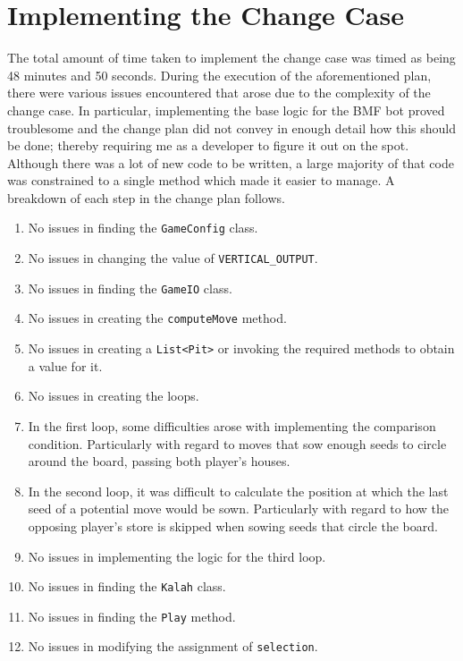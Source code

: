 \documentclass[10pt, a4paper, conference]{IEEEtran}
\begin{document}
\section{Implementing the Change Case}
The total amount of time taken to implement the change case was timed as being 
48 minutes and 50 seconds. During the execution of the aforementioned plan,
there were various issues encountered that arose due to the complexity of
the change case. In particular, implementing the base logic for the BMF bot
proved troublesome and the change plan did not convey in enough detail how
this should be done; thereby requiring me as a developer to figure it out on
the spot. Although there was a lot of new code to be written, a large majority
of that code was constrained to a single method which made it easier to
manage. A breakdown of each step in the change plan follows.
\begin{enumerate}
  \item No issues in finding the \texttt{GameConfig} class.
  \item No issues in changing the value of \texttt{VERTICAL\_OUTPUT}.
  \item No issues in finding the \texttt{GameIO} class.
  \item No issues in creating the \texttt{computeMove} method.
  \item No issues in creating a \texttt{List<Pit>} or invoking the required
    methods to obtain a value for it.
  \item No issues in creating the loops.
  \item In the first loop, some difficulties arose with implementing the
    comparison condition. Particularly with regard to moves that sow enough
    seeds to circle around the board, passing both player's houses.
  \item In the second loop, it was difficult to calculate the position at which
    the last seed of a potential move would be sown. Particularly with regard
    to how the opposing player's store is skipped when sowing seeds that circle
    the board.
  \item No issues in implementing the logic for the third loop.
  \item No issues in finding the \texttt{Kalah} class.
  \item No issues in finding the \texttt{Play} method.
  \item No issues in modifying the assignment of \texttt{selection}.
\end{enumerate}
\end{document}
